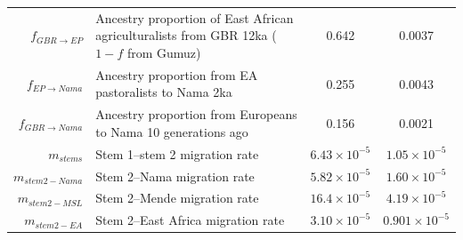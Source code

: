 \documentclass[]{article}
\begin{document}
\begin{table}[ht]
\begin{tabular}[t]{rP{8cm}cc}
    $f_{GBR \rightarrow EP}$ & Ancestry proportion of East African agriculturalists from GBR 12ka ($1-f$ from Gumuz) & 0.642 & 0.0037 \\
    $f_{EP \rightarrow Nama}$ & Ancestry proportion from EA pastoralists to Nama 2ka & 0.255 & 0.0043 \\
    $f_{GBR \rightarrow Nama}$ & Ancestry proportion from Europeans to Nama 10 generations ago & 0.156 & 0.0021 \\
    $m_{stems}$ & Stem 1--stem 2 migration rate & $6.43\times10^{-5}$ & $1.05\times10^{-5}$ \\
    $m_{stem2-Nama}$ & Stem 2--Nama migration rate & $5.82\times10^{-5}$ & $1.60\times10^{-5}$ \\
    $m_{stem2-MSL}$ & Stem 2--Mende migration rate & $16.4\times10^{-5}$ & $4.19\times10^{-5}$ \\
    $m_{stem2-EA}$ & Stem 2--East Africa migration rate & $3.10\times10^{-5}$ & $0.901\times10^{-5}$ \\
    \bottomrule
\end{tabular}
\end{table}
\end{document}
